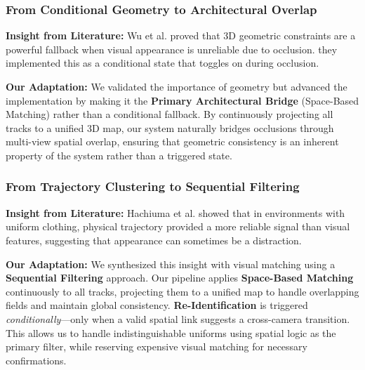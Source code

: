\subsubsection{From Conditional Geometry to Architectural Overlap}
\textbf{Insight from Literature:} Wu et al. \cite{geom_consist_tracking} proved that 3D geometric constraints are a powerful fallback when visual appearance is unreliable due to occlusion. they implemented this as a conditional state that toggles on during occlusion.
\par
\textbf{Our Adaptation:} We validated the importance of geometry but advanced the implementation by making it the \textbf{Primary Architectural Bridge} (Space-Based Matching) rather than a conditional fallback. By continuously projecting all tracks to a unified 3D map, our system naturally bridges occlusions through multi-view spatial overlap, ensuring that geometric consistency is an inherent property of the system rather than a triggered state.

\subsubsection{From Trajectory Clustering to Sequential Filtering}
\textbf{Insight from Literature:} Hachiuma et al. \cite{hospital_tracking} showed that in environments with uniform clothing, physical trajectory provided a more reliable signal than visual features, suggesting that appearance can sometimes be a distraction.
\par
\textbf{Our Adaptation:} We synthesized this insight with visual matching using a \textbf{Sequential Filtering} approach. Our pipeline applies \textbf{Space-Based Matching} continuously to all tracks, projecting them to a unified map to handle overlapping fields and maintain global consistency. \textbf{Re-Identification} is triggered \textit{conditionally}---only when a valid spatial link suggests a cross-camera transition. This allows us to handle indistinguishable uniforms using spatial logic as the primary filter, while reserving expensive visual matching for necessary confirmations.

